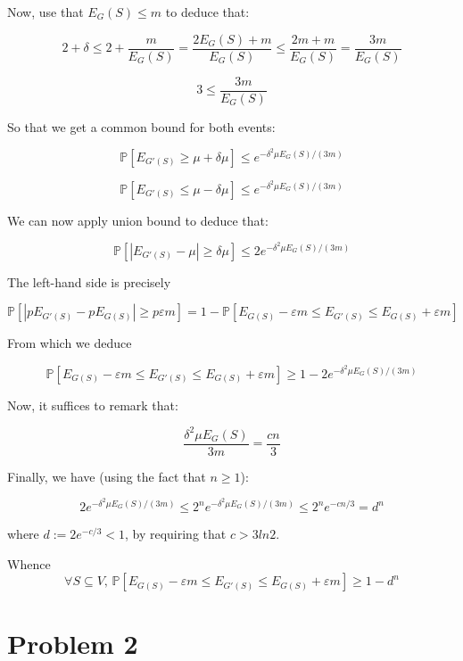 \documentclass[a4paper, 11pt]{article}
\begin{document}
Now, use that $E_G(S) \le m$ to deduce that:

$$2 + \delta \le 2 + \frac{m}{E_G(S)} = \frac{2 E_G(S) + m}{E_G(S)} \le \frac{2m + m}{E_G(S)} = \frac{3m}{E_G(S)}$$

$$3 \le \frac{3m}{E_G(S)}$$

So that we get a common bound for both events:

$$\mathbb{P}\left[E_{G'(S)} \ge \mu + \delta \mu\right] \le e^{-\delta^2\mu E_G(S)/(3m)}$$

$$\mathbb{P}\left[E_{G'(S)} \le \mu - \delta \mu\right] \le e^{-\delta^2\mu E_G(S)/(3m)}$$

We can now apply union bound to deduce that:

$$\mathbb{P}\left[|E_{G'(S)} - \mu| \ge \delta \mu\right] \le 2 e^{-\delta^2\mu E_G(S)/(3m)}$$

The left-hand side is precisely

$$\mathbb{P}\left[|p E_{G'(S)} - p E_{G(S)}| \ge p \varepsilon m\right] = 1 - \mathbb{P}\left[E_{G(S)} - \varepsilon m \le E_{G'(S)} \le E_{G(S)} + \varepsilon m\right]$$

From which we deduce

$$\mathbb{P}\left[E_{G(S)} - \varepsilon m \le E_{G'(S)} \le E_{G(S)} + \varepsilon m\right] \ge 1 - 2e^{-\delta^2\mu E_G(S)/(3m)}$$

Now, it suffices to remark that:

$$\frac{\delta^2\mu E_G(S)}{3m} = \frac{cn}{3}$$

Finally, we have (using the fact that $n \ge 1$):

$$2e^{-\delta^2\mu E_G(S)/(3m)} \le 2^n e^{-\delta^2\mu E_G(S)/(3m)} \le 2^n e^{-cn/3} = d^n $$

where $d := 2e^{- c/3} < 1$, by requiring that $c > 3ln2$.

Whence $$\boxed{\forall S \subseteq V,\, \mathbb{P}\left[E_{G(S)} - \varepsilon m \le E_{G'(S)} \le E_{G(S)} + \varepsilon m\right] \ge 1-d^n}$$

\newpage

\section*{Problem 2}
\end{document}

